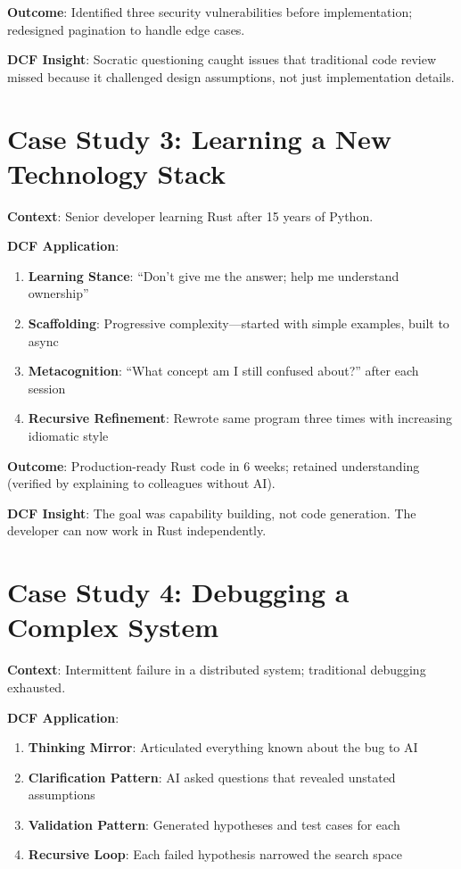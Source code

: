 \textbf{Outcome}: Identified three security vulnerabilities before implementation; redesigned pagination to handle edge cases.

\textbf{DCF Insight}: Socratic questioning caught issues that traditional code review missed because it challenged design assumptions, not just implementation details.

\section{Case Study 3: Learning a New Technology Stack}

\textbf{Context}: Senior developer learning Rust after 15 years of Python.

\textbf{DCF Application}:
\begin{enumerate}
    \item \textbf{Learning Stance}: ``Don't give me the answer; help me understand ownership''
    \item \textbf{Scaffolding}: Progressive complexity---started with simple examples, built to async
    \item \textbf{Metacognition}: ``What concept am I still confused about?'' after each session
    \item \textbf{Recursive Refinement}: Rewrote same program three times with increasing idiomatic style
\end{enumerate}

\textbf{Outcome}: Production-ready Rust code in 6 weeks; retained understanding (verified by explaining to colleagues without AI).

\textbf{DCF Insight}: The goal was capability building, not code generation. The developer can now work in Rust independently.

\section{Case Study 4: Debugging a Complex System}

\textbf{Context}: Intermittent failure in a distributed system; traditional debugging exhausted.

\textbf{DCF Application}:
\begin{enumerate}
    \item \textbf{Thinking Mirror}: Articulated everything known about the bug to AI
    \item \textbf{Clarification Pattern}: AI asked questions that revealed unstated assumptions
    \item \textbf{Validation Pattern}: Generated hypotheses and test cases for each
    \item \textbf{Recursive Loop}: Each failed hypothesis narrowed the search space
\end{enumerate}

